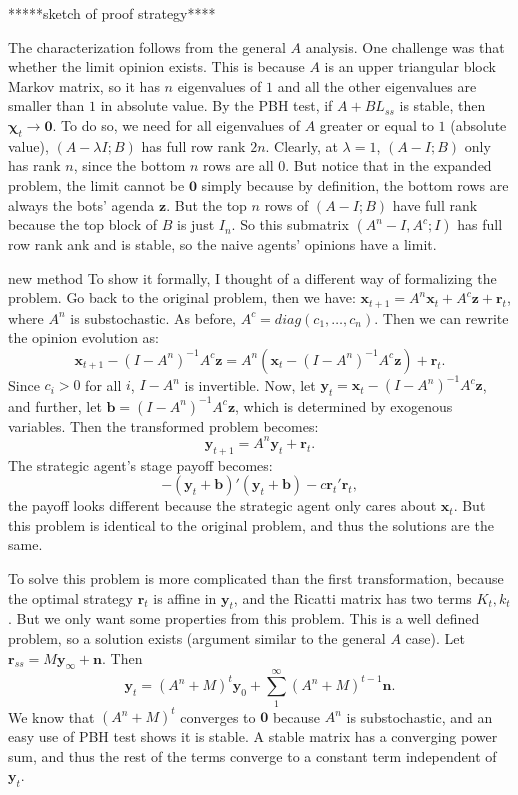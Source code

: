 \documentclass{article}
\newcommand{\x}{\mathbf{x}}
\newcommand{\y}{\mathbf{y}}
\newcommand{\be}{\mathbf{b}}
\newcommand{\re}{\mathbf{r}}
\newcommand{\z}{\mathbf{z}}
\newcommand{\wl}[1]{{\color{blue} #1}}
\begin{document}
*****sketch of proof strategy****

The characterization follows from the general $A$ analysis. One challenge was that whether the limit opinion exists. This is because $A$ is an upper triangular block Markov matrix, so it has $n$ eigenvalues of $1$ and all the other eigenvalues are smaller than $1$ in absolute value. By the PBH test, if $A+BL_{ss}$ is stable, then $\bm\chi_t\to \mathbf 0$. To do so, we need for all eigenvalues of $A$ greater or equal to $1$ (absolute value), $(A-\lambda I;B)$ has full row rank $2n$. Clearly, at $\lambda=1$, $(A-I;B)$ only has rank $n$, since the bottom $n$ rows are all $0$. But notice that in the expanded problem, the limit cannot be $\mathbf 0$ simply because by definition, the bottom rows are always the bots' agenda $\z$. But the top $n$ rows of $(A-I;B)$ have full rank because the top block of $B$ is just $I_n$. So this submatrix $(A^n-I, A^c; I)$ has full row rank ank and is stable, so the naive agents' opinions have a limit. 

\wl{new method} To show it formally, I thought of a different way of formalizing the problem. Go back to the original problem, then we have:
$\x_{t+1}=A^n\x_t+A^c\z+\re_t$, where $A^n$ is substochastic. As before, $A^c=diag(c_1,\ldots,c_n)$. Then we can rewrite the opinion evolution as:
$$\x_{t+1}-(I-A^n)^{-1}A^c\z=A^n(\x_t-(I-A^n)^{-1}A^c\z)+\re_t.$$ Since $c_i>0$ for all $i$, $I-A^n$ is invertible. Now, let $\y_t=\x_t-(I-A^n)^{-1}A^c\z$, and further, let $\be=(I-A^n)^{-1}A^c\z$, which is determined by exogenous variables. Then the transformed problem becomes:
$$\y_{t+1}=A^n\y_t+\re_t.$$ The strategic agent's stage payoff becomes:
$$-(\y_t+\be)'(\y_t+\be)-c\re_t'\re_t,$$ the payoff looks different because the strategic agent only cares about $\x_t$.  But this problem is identical to the original problem, and thus the solutions are the same. 

To solve this problem is more complicated than the first transformation, because the optimal strategy $\re_t$ is affine in $\y_t$, and the Ricatti matrix has two terms $K_t,k_t$. But we only want some properties from this problem. This is a well defined problem, so a solution exists (argument similar to the general $A$ case). Let $\re_{ss}=M\y_\infty+\mathbf n$. Then $$\y_t=(A^n+M)^t\y_0+\sum_1^\infty(A^n+M)^{t-1}\mathbf n.$$ We know that $(A^n+M)^t$ converges to $\mathbf 0$ because $A^n$ is substochastic, and an easy use of PBH test shows it is stable. A stable matrix has a converging power sum, and thus the rest of the terms converge to a constant term independent of $\y_t$.
\end{document}
